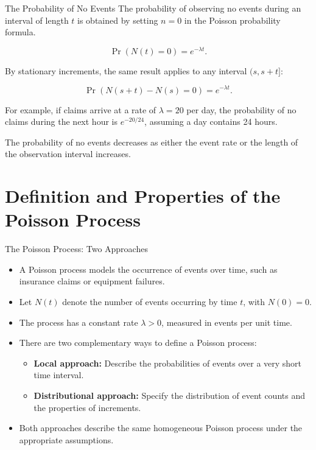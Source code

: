 \documentclass[
  ignorenonframetext,
  aspectratio=169,
]{beamer}
\providecommand{\tightlist}{%
  \setlength{\itemsep}{0pt}\setlength{\parskip}{0pt}}
\begin{document}
\begin{frame}{The Probability of No Events}
\protect{}\label{the-probability-of-no-events}
The probability of observing no events during an interval of length
\(t\) is obtained by setting \(n=0\) in the Poisson probability formula.

\[
\Pr(N(t)=0)=e^{-\lambda t}.
\]

By stationary increments, the same result applies to any interval
\((s,s+t]\):

\[
\Pr(N(s+t)-N(s)=0)=e^{-\lambda t}.
\]

For example, if claims arrive at a rate of \(\lambda=20\) per day, the
probability of no claims during the next hour is \(e^{-20/24}\),
assuming a day contains 24 hours.

The probability of no events decreases as either the event rate or the
length of the observation interval increases.
\end{frame}

\section{Definition and Properties of the Poisson
Process}\label{definition-and-properties-of-the-poisson-process}

\begin{frame}{The Poisson Process: Two Approaches}
\protect{}\label{the-poisson-process-two-approaches}
\begin{itemize}
\tightlist
\item
  A Poisson process models the occurrence of events over time, such as
  insurance claims or equipment failures.
\item
  Let \(N(t)\) denote the number of events occurring by time \(t\), with
  \(N(0)=0\).
\item
  The process has a constant rate \(\lambda>0\), measured in events per
  unit time.
\item
  There are two complementary ways to define a Poisson process:

  \begin{itemize}
  \tightlist
  \item
    \textbf{Local approach:} Describe the probabilities of events over a
    very short time interval.
  \item
    \textbf{Distributional approach:} Specify the distribution of event
    counts and the properties of increments.
  \end{itemize}
\item
  Both approaches describe the same homogeneous Poisson process under
  the appropriate assumptions.
\end{itemize}
\end{frame}
\end{document}
